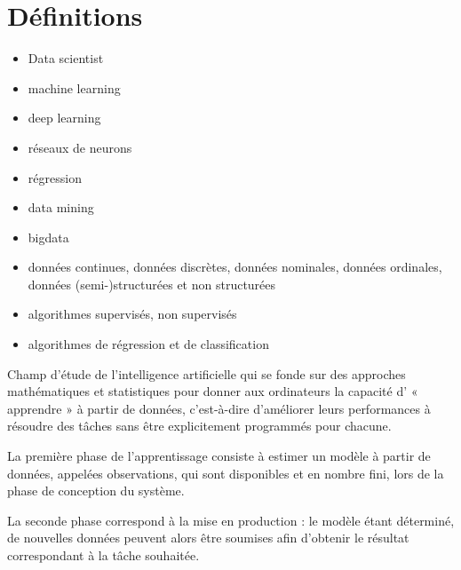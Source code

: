 \section{Définitions}

\begin{itemize}
\item Data scientist
\item machine learning
\item deep learning
\item réseaux de neurons
\item régression
\item data mining
\item bigdata
\item données continues, données discrètes, données nominales, données ordinales, données (semi-)structurées et non structurées

\end{itemize}


\begin{itemize}
\item algorithmes supervisés, non supervisés
\item algorithmes de régression et de classification
\end{itemize}

\begin{defi} 
Champ d'étude de l'intelligence artificielle qui se fonde sur des approches mathématiques et statistiques pour donner aux ordinateurs la capacité d' « apprendre » à partir de données, c'est-à-dire d'améliorer leurs performances à résoudre des tâches sans être explicitement programmés pour chacune. 

La première phase de l'apprentissage consiste à estimer un modèle à partir de données, appelées observations, qui sont disponibles et en nombre fini, lors de la phase de conception du système.

 La seconde phase correspond à la mise en production : le modèle étant déterminé, de nouvelles données peuvent alors être soumises afin d'obtenir le résultat correspondant à la tâche souhaitée.
\end{defi}


